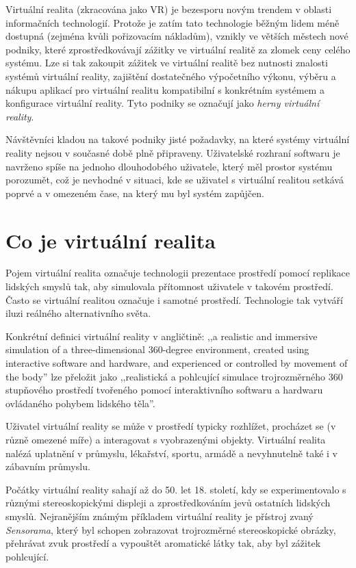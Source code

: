 Virtuální realita (zkracována jako VR) je bezesporu novým trendem v
oblasti informačních technologií. Protože je zatím tato technologie běžným
lidem méně dostupná (zejména kvůli pořizovacím nákladům), vznikly ve větších městech nové podniky, které
zprostředkovávají zážitky ve virtuální realitě za zlomek ceny celého
systému. Lze si tak zakoupit zážitek ve virtuální realitě bez nutnosti znalosti systémů virtuální reality, zajištění
dostatečného výpočetního výkonu, výběru a nákupu aplikací pro virtuální
realitu kompatibilní s konkrétním systémem a konfigurace virtuální reality. Tyto podniky se označují jako \emph{herny virtuální reality}. \autocite{herny}

Návštěvníci kladou na takové podniky jisté požadavky, na které
systémy virtuální reality nejsou v současné době plně připraveny.
Uživatelské rozhraní softwaru je navrženo spíše na jednoho dlouhodobého
uživatele, který měl prostor systému porozumět, což je nevhodné v
situaci, kde se uživatel s virtuální realitou setkává poprvé a v
omezeném čase, na který mu byl systém zapůjčen.

\section{Co je virtuální
realita}\label{co-je-virtuuxe1lnuxed-realita}

Pojem virtuální realita označuje technologii prezentace prostředí pomocí
replikace lidských smyslů tak, aby simulovala přítomnost uživatele v
takovém prostředí. Často se virtuální realitou označuje i samotné
prostředí. Technologie tak vytváří iluzi reálného alternativního světa. \autocite{ovr}

Konkrétní definici virtuální reality v angličtině: ,,a realistic and
immersive simulation of a three-dimensional 360-degree environment,
created using interactive software and hardware, and experienced or
controlled by movement of the body'' \autocite{vrdef} lze přeložit jako ,,realistická a
pohlcující simulace trojrozměrného 360 stupňového prostředí tvořeného
pomocí interaktivního softwaru a hardwaru ovládaného pohybem lidského
těla''.

Uživatel virtuální reality se může v prostředí typicky rozhlížet,
procházet se (v různě omezené míře) a interagovat s vyobrazenými
objekty. \autocite{vrdef2} Virtuální realita nalézá uplatnění v průmyslu, lékařství,
sportu, armádě a nevyhnutelně také i v zábavním průmyslu. \autocite{vrusage}

Počátky virtuální reality sahají až do 50. let 18. století, kdy se
experimentovalo s různými stereoskopickými displeji a zprostředkováním
jevů ostatních lidských smyslů. Nejranějším známým příkladem virtuální
reality je přístroj zvaný \emph{Sensorama}, který byl schopen zobrazovat
trojrozměrné stereoskopické obrázky, přehrávat zvuk prostředí a
vypouštět aromatické látky tak, aby byl zážitek pohlcující. \autocite{oldvr}

